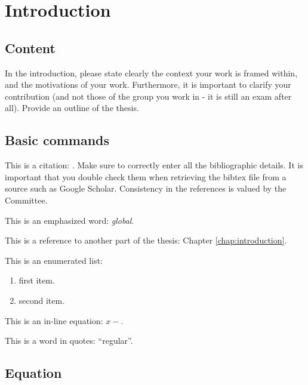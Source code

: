 
\chapter{Introduction}
\label{chap:first}
\ifpdf
    \graphicspath{{Chapter1/Figures/PNG/}{Chapter1/Figures/PDF/}{Chapter1/Figures/}{Chapter1/Figures/EPS/}}
\else
    \graphicspath{{Chapter1/Figures/EPS/}{Chapter1/Figures/}}
\fi


\section{Content}
In the introduction, please state clearly the context your work is framed within, and the motivations of your work. Furthermore, it is important to clarify your contribution (and not those of the group you work in - it is still an exam after all). Provide an outline of the thesis.


\section{Basic commands}
\label{sec:basic_commands}
This is a citation: \cite{cacciaActiveSonarbasedBottomfollowing1999}. Make sure to correctly enter all the bibliographic details. It is important that you double check them when retrieving the bibtex file from a source such as Google Scholar. Consistency in the references is valued by the Committee.

This is an emphasized word: \emph{global}.

This is a reference to another part of the thesis: Chapter \ref{chap:introduction}.

This is an enumerated list:
\begin{enumerate}
\item first item.
\item second item.
\end{enumerate}

This is an in-line equation: $x-$.

This is a word in quotes: ``regular''.

\section{Equation}
\label{sec:equation}

